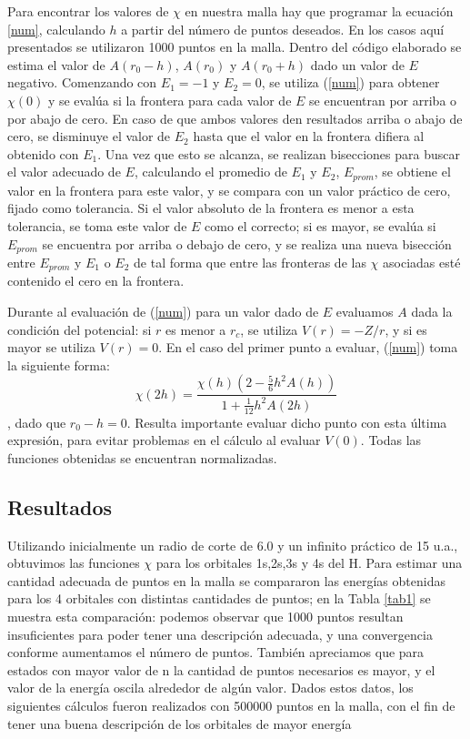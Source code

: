 \documentclass[12pt,a4paper]{report}
\begin{document}
Para encontrar los valores de $\chi$ en nuestra malla hay que programar la ecuación \ref{num}, calculando $h$ a partir del número de puntos deseados. En los casos aquí presentados se utilizaron 1000 puntos en la malla. Dentro del código elaborado se estima el valor de $A(r_0-h)$, $A(r_0)$ y $A(r_0+h)$ dado un valor de $E$ negativo. Comenzando con $E_{1}=-1$ y $E_{2}=0$, se utiliza (\ref{num}) para obtener $\chi(0)$ y se evalúa si la frontera para cada valor de $E$ se encuentran por arriba o por abajo de cero. En caso de que ambos valores den resultados arriba o abajo de cero, se disminuye el valor de $E_2$ hasta que el valor en la frontera difiera al obtenido con $E_1$. Una vez que esto se alcanza, se realizan bisecciones para buscar el valor adecuado de $E$, calculando el promedio de $E_{1}$ y $E_{2}$, $E_{prom}$, se obtiene el valor en la frontera para este valor, y se compara con un valor práctico de cero, fijado como tolerancia. Si el valor absoluto de la frontera es menor a esta tolerancia, se toma este valor de $E$ como el correcto; si es mayor, se evalúa si $E_{prom}$ se encuentra por arriba o debajo de cero, y se realiza una nueva bisección entre $E_{prom}$ y $E_1$ o $E_2$ de tal forma que entre las fronteras de las $\chi$ asociadas esté contenido el cero en la frontera.

Durante al evaluación de (\ref{num}) para un valor dado de $E$ evaluamos $A$ dada la condición del potencial: si $r$ es menor a $r_c$, se utiliza $V(r)=-Z/r$, y si es mayor se utiliza $V(r)=0$. En el caso del primer punto a evaluar, (\ref{num}) toma la siguiente forma:
\begin{equation}
\chi(2h)=\frac{\chi(h)(2-\frac{5}{6}h^2 A(h))}{1+\frac{1}{12}h^2 A(2h)}
\end{equation}
, dado que $r_0-h=0$. Resulta importante evaluar dicho punto con esta última expresión, para evitar problemas en el cálculo al evaluar $V(0)$. Todas las funciones obtenidas se encuentran normalizadas.

\subsection*{Resultados}

Utilizando inicialmente un radio de corte de 6.0 y un infinito práctico de 15 u.a., obtuvimos las funciones $\chi$ para los orbitales 1s,2s,3s y 4s del H. Para estimar una cantidad adecuada de puntos en la malla se compararon las energías obtenidas para los 4 orbitales con distintas cantidades de puntos; en la Tabla \ref{tab1} se muestra esta comparación: podemos observar que 1000 puntos resultan insuficientes para poder tener una descripción adecuada, y una convergencia conforme aumentamos el número de puntos. También apreciamos que para estados con mayor valor de n la cantidad de puntos necesarios es mayor, y el valor de la energía oscila alrededor de algún valor. Dados estos datos, los siguientes cálculos fueron realizados con 500000 puntos en la malla, con el fin de tener una buena descripción de los orbitales de mayor energía
\end{document}
